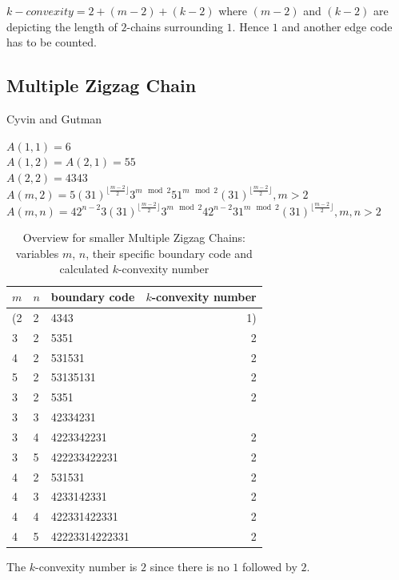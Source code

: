 \documentclass[a4paper,10pt]{article}
\begin{document}
{$k-convexity = 2 + (m-2) + (k-2)$ where $(m-2)$ and $(k-2)$ are depicting the 
length of $2$-chains surrounding $1$. Hence $1$ and another edge code has to be
counted.

\subsection{Multiple Zigzag Chain}

Cyvin and Gutman~\cite[p.~143]{cyvin_1988}

\cite{gordon_1952}
\cite{cyvin_1986}
\cite{cyvin_1985}
\cite{cyvin_1986number}
\cite{gutman_1987}

$A(1,1) = 6$\\
$A(1,2) = A(2,1) =55$\\
$A(2,2) = 4343$\\
$A(m,2) = 5 (31)^{\lfloor\frac{m-2}{2} \rfloor} 3^{m \mod 2} 5 1^{m \mod 2}  (31)^{\lfloor\frac{m-2}{2} \rfloor}, m>2$\\
$A(m,n) = 4 2^{n-2} 3  (31)^{\lfloor\frac{m-2}{2} \rfloor}  3^{m \mod 2} 4 2^{n-2} 3  1^{m \mod 2}  (31)^{\lfloor\frac{m-2}{2} \rfloor}, m,n>2$

\begin{table}
 \caption{Overview for smaller Multiple Zigzag Chains: variables $m$, $n$, their specific boundary code and calculated $k$-convexity number}
 \medskip
 \begin{tabular}{|l l l r|}
 \hline
  $m$ & $n$ & boundary code & $k$-convexity number\\
  \hline
  (2 & 2 & 4343 & 1) \\
  3 & 2 & 5351 & 2 \\
  4 & 2 & 531531 & 2 \\
  5 & 2 & 53135131 & 2 \\
  3 & 2 & 5351 & 2 \\
  3 & 3 & 42334231 &  \\
  3 & 4 & 4223342231 & 2 \\
  3 & 5 & 422233422231 & 2 \\
  4 & 2 & 531531 & 2 \\
  4 & 3 & 4233142331 & 2 \\
  4 & 4 & 422331422331 & 2 \\
  4 & 5 & 42223314222331 & 2 \\
  \hline
 \end{tabular}
\end{table}

The $k$-convexity number is $2$ since there is no $1$ followed by $2$.

}
\end{document}
